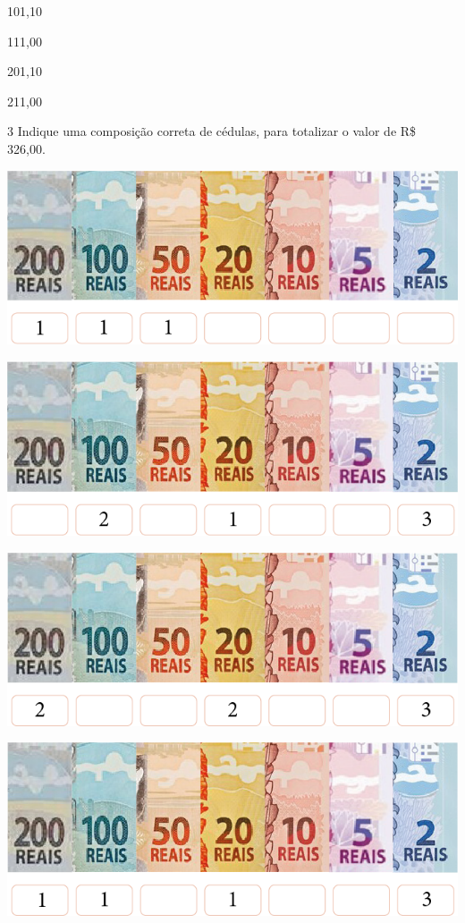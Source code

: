 \begin{escolha}
\item 101,10

\item 111,00

\item 201,10

\item 211,00
\end{escolha}

\pagebreak
\num{3} Indique uma composição correta de cédulas, para totalizar o valor de R\$ 326,00.

\begin{escolha}
\item \includegraphics[width=.7\textwidth]{./media/image80.png}

\item \includegraphics[width=.7\textwidth]{./media/image81.png}

\item \includegraphics[width=.7\textwidth]{./media/image82.png}

\item \includegraphics[width=.7\textwidth]{./media/image83.png}
\end{escolha}


